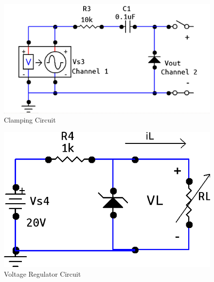 \documentclass[twocolumn,english]{IEEEtran}
\begin{document}
  \begin{figure}[htpb]
  \begin{centering}
  \begin{center}
  \includegraphics[width=\linewidth]{./3a.png}
  \caption{Clamping Circuit}
  \label{fig:circuit_2}
  \end{center}
  \par\end{centering}
  \end{figure}

  \begin{figure}[htpb]
  \begin{centering}
  \begin{center}
  \includegraphics[width=\linewidth]{./3.png}
  \caption{Voltage Regulator Circuit}
  \label{fig:circuit_3}
  \end{center}
  \par\end{centering}
  \end{figure}
\end{document}
